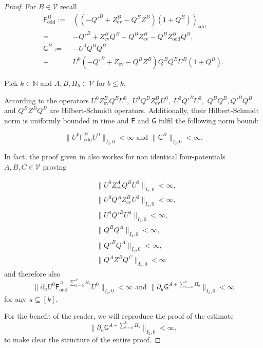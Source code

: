 \documentclass[b5paper,draft,openbib,12pt]{memoir}
\DeclareMathOperator{\ev}{ev}
\DeclareMathOperator{\odd}{odd}
\begin{document}
\begin{proof}
For \(B\in\mathcal{V}\) recall 
\begin{align}
\mathsf{F}^B_{\odd}:=& ((-{Q'}^B+Z^B_{\mathrm{ev}}-Q^BZ^B)(1+Q^B))_{\odd}\\\label{Fodd sum}
=&-{Q'}^{B}+Z_{\ev}^B Q^B -Q^BZ^B_{\ev} - Q^B Z_{\odd}^B Q^B,\\
\mathsf{G}^B:=&- U^0Q^BQ^B \\
+& U^0(-{Q'}^B+Z_{\mathrm{ev}}-Q^B Z^B)Q^B Q^B U^B (1+Q^B).
\end{align}

Pick \(k\in\mathbb{N}\)
and  \(A,B, H_b\in\mathcal{V}\) for \(b\le k\).

According to \cite[lemma 3.7]{ivp0} the operators 
\(U^0Z_{\ev}^B Q^B U^0,\) \(U^0 Q^B Z_{\ev}^B U^0,\) 
\(U^0 {Q'}^{B}U^0,\) \(Q^B Q^B, {Q'}^B Q^B\) and 
\(Q^B Z^B Q^B\) are Hilbert-Schmidt operators.
Additionally, their  Hilbert-Schmidt norm is uniformly
bounded in time and \(\mathsf{F}\) and \(\mathsf{G}\) fulfil the following 
norm bound:

\begin{equation}
\|U^0 \mathsf{F}_{\odd}^BU^0\|_{I_2,0}<\infty 
\text{ and } \|\mathsf{G}^B\|_{I_2,0}<\infty.
\end{equation}

In fact, the proof given in \cite{ivp0} also workes
for non identical four-potentials \(A,B,C\in\mathcal{V}\)
proving

\begin{align}
&\| U^0Z_{\ev}^A Q^B U^0\|_{I_2,0}<\infty,\\
&\|U^0 Q^A Z_{\ev}^B U^0\|_{I_2,0}<\infty,\\ 
&\|U^0 {Q'}^{B}U^0\|_{I_2,0}<\infty,\\
&\|Q^B Q^A\|_{I_2,0}<\infty,\\ 
&\|{Q'}^B Q^A\|_{I_2,0}<\infty,\\ 
&\|Q^A Z^B Q^C\|_{I_2,0}<\infty
\end{align}
and therefore also 
\begin{equation}
\|\partial_u U^0 \mathsf{F}_{\odd}^{A+\sum_{b=0}^k H_b}U^0\|_{I_2,0}<\infty 
\text{ and } \|\partial_u \mathsf{G}^{A+\sum_{b=0}^k H_b}\|_{I_2,0}<\infty
\end{equation}
for any \(u\subseteq [k]\). 

For the benefit of the reader,
we will reproduce the proof of the estimate
\begin{equation}\label{HS property of G}
\|\partial_u \mathsf{G}^{A+\sum_{b=0}^k H_b}\|_{I_2,0}<\infty,
\end{equation}
to make clear the structure of the entire proof.


\end{proof}
\end{document}
